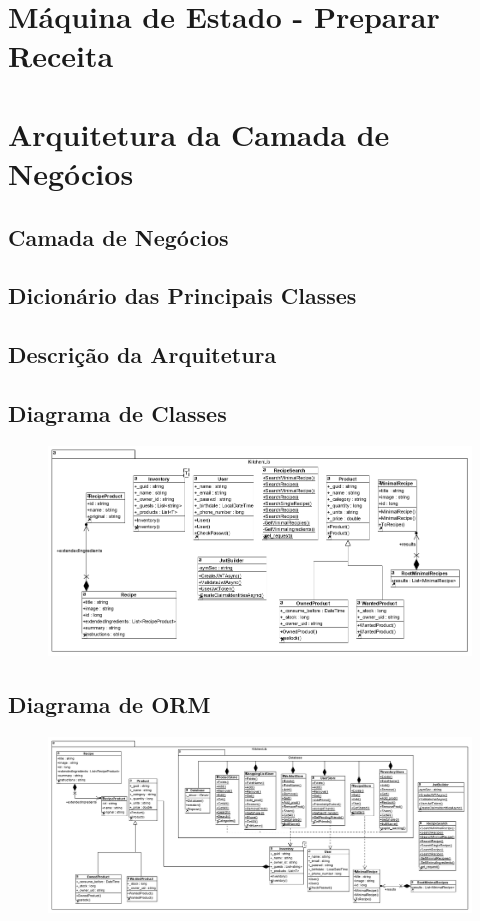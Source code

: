 \documentclass[a4paper]{report}
\begin{document}
\chapter{Máquina de Estado - Preparar Receita}

\chapter{Arquitetura da Camada de Negócios}
    \section{Camada de Negócios}
    \section{Dicionário das Principais Classes}
    \section{Descrição da Arquitetura}
    \section{Diagrama de Classes}
        \begin{figure}[H]
        \centering
                \includegraphics[width=\textwidth]{images/diagrama_de_classes.png}
        \end{figure}

    \section{Diagrama de ORM}
        \begin{figure}[H]
        \centering
            \includegraphics[width=\textwidth]{images/diagrama_de_ORN.png}
        \end{figure}
\end{document}
